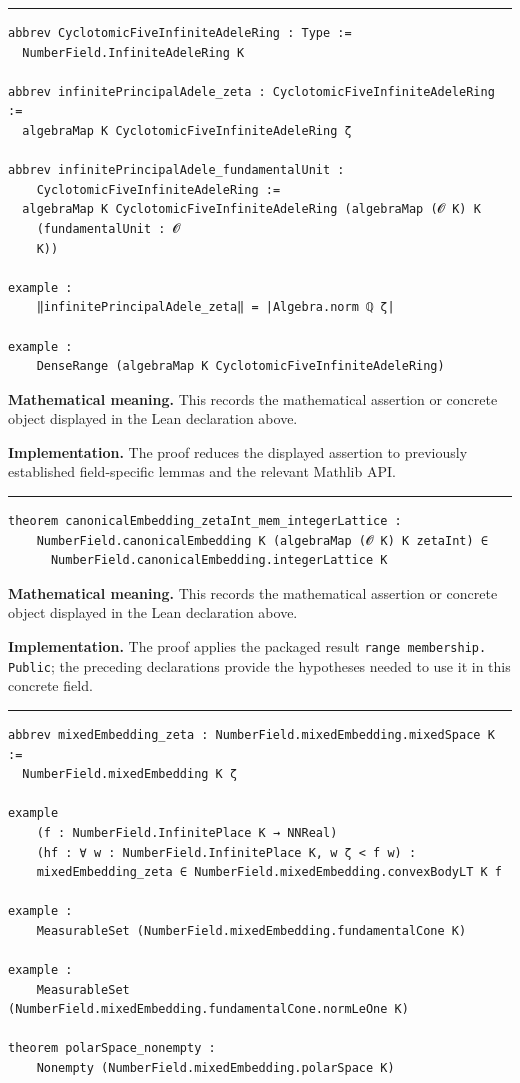 \documentclass[UTF8,a4paper,11pt,fontset=fandol]{ctexart}
\theoremstyle{definition}
\newcommand{\statementsep}{\par\medskip\hrule\medskip}
\begin{document}
\statementsep
\begin{verbatim}
abbrev CyclotomicFiveInfiniteAdeleRing : Type :=
  NumberField.InfiniteAdeleRing K

abbrev infinitePrincipalAdele_zeta : CyclotomicFiveInfiniteAdeleRing :=
  algebraMap K CyclotomicFiveInfiniteAdeleRing ζ

abbrev infinitePrincipalAdele_fundamentalUnit :
    CyclotomicFiveInfiniteAdeleRing :=
  algebraMap K CyclotomicFiveInfiniteAdeleRing (algebraMap (𝓞 K) K
    (fundamentalUnit : 𝓞
    K))

example :
    ‖infinitePrincipalAdele_zeta‖ = |Algebra.norm ℚ ζ|

example :
    DenseRange (algebraMap K CyclotomicFiveInfiniteAdeleRing)
\end{verbatim}
\noindent\textbf{Mathematical meaning.} This records the mathematical assertion or concrete object displayed in the Lean declaration above.\par
\noindent\textbf{Implementation.} The proof reduces the displayed assertion to previously established field-specific lemmas and the relevant Mathlib API.\par
\statementsep
\begin{verbatim}
theorem canonicalEmbedding_zetaInt_mem_integerLattice :
    NumberField.canonicalEmbedding K (algebraMap (𝓞 K) K zetaInt) ∈
      NumberField.canonicalEmbedding.integerLattice K
\end{verbatim}
\noindent\textbf{Mathematical meaning.} This records the mathematical assertion or concrete object displayed in the Lean declaration above.\par
\noindent\textbf{Implementation.} The proof applies the packaged result \texttt{range membership.\allowbreak{} Public}; the preceding declarations provide the hypotheses needed to use it in this concrete field.\par
\statementsep
\begin{verbatim}
abbrev mixedEmbedding_zeta : NumberField.mixedEmbedding.mixedSpace K :=
  NumberField.mixedEmbedding K ζ

example
    (f : NumberField.InfinitePlace K → NNReal)
    (hf : ∀ w : NumberField.InfinitePlace K, w ζ < f w) :
    mixedEmbedding_zeta ∈ NumberField.mixedEmbedding.convexBodyLT K f

example :
    MeasurableSet (NumberField.mixedEmbedding.fundamentalCone K)

example :
    MeasurableSet (NumberField.mixedEmbedding.fundamentalCone.normLeOne K)

theorem polarSpace_nonempty :
    Nonempty (NumberField.mixedEmbedding.polarSpace K)
\end{verbatim}
\end{document}
